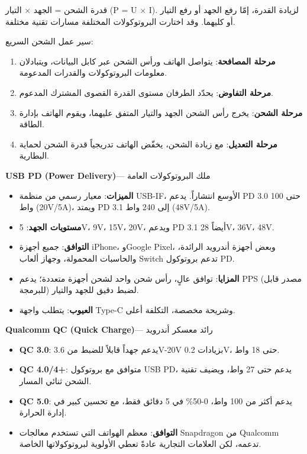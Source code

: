 
قدرة الشحن = الجهد × التيار (P = U × I). لزيادة القدرة، إمّا رفع الجهد أو رفع التيار أو كليهما. وقد اختارت البروتوكولات المختلفة مسارات تقنية مختلفة.

سير عمل الشحن السريع:

\begin{enumerate}
  \item \textbf{مرحلة المصافحة}: يتواصل الهاتف ورأس الشحن عبر كابل البيانات، ويتبادلان معلومات البروتوكولات والقدرات المدعومة.
  \item \textbf{مرحلة التفاوض}: يحدّد الطرفان مستوى القدرة القصوى المشترك المدعوم.
  \item \textbf{مرحلة الشحن}: يخرج رأس الشحن الجهد والتيار المتفق عليهما، ويقوم الهاتف بإدارة الطاقة.
  \item \textbf{مرحلة التعديل}: مع زيادة الشحن، يخفّض الهاتف تدريجياً قدرة الشحن لحماية البطارية.
\end{enumerate}


\textbf{USB PD (Power Delivery)}— ملك البروتوكولات العامة

\begin{itemize}
  \item \textbf{الميزات}: معيار رسمي من منظمة USB-IF، الأوسع انتشاراً. يدعم PD 3.0 حتى 100 واط (20V/5A)، ويمتد PD 3.1 إلى 240 واط (48V/5A).
  \item \textbf{مستويات الجهد}: 5V، 9V، 15V، 20V، ويدعم PD 3.1 أيضاً 28V، 36V، 48V.
  \item \textbf{التوافق}: جميع أجهزة iPhone، وGoogle Pixel، وبعض أجهزة أندرويد الرائدة، والحاسبات المحمولة، وجهاز ألعاب Switch تدعم بروتوكول PD.
  \item \textbf{المزايا}: توافق عالٍ، رأس شحن واحد لشحن أجهزة متعددة؛ يدعم PPS (مصدر قابل للبرمجة) لضبط دقيق للجهد والتيار.
  \item \textbf{العيوب}: يتطلب واجهة Type-C وشريحة مخصصة، التكلفة أعلى.
\end{itemize}

\textbf{Qualcomm QC (Quick Charge)}— رائد معسكر أندرويد

\begin{itemize}
  \item \textbf{QC 3.0}: يدعم جهداً قابلاً للضبط من 3.6V-20V بزيادات 0.2V، حتى 18 واط.
  \item \textbf{QC 4.0/4+}: متوافق مع بروتوكول USB PD، يدعم حتى 27 واط، ويضيف تقنية الشحن ثنائي المسار.
  \item \textbf{QC 5.0}: يدعم أكثر من 100 واط، 0-50\% في 5 دقائق فقط، مع تحسين كبير في إدارة الحرارة.
  \item \textbf{التوافق}: معظم الهواتف التي تستخدم معالجات Snapdragon من Qualcomm تدعمه، لكن العلامات التجارية عادةً تعطي الأولوية لبروتوكولاتها الخاصة.
\end{itemize}

